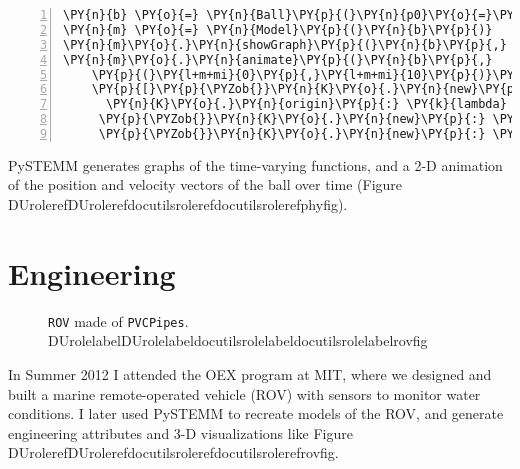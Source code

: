 \documentclass[letterpaper,compsoc,twoside]{IEEEtran}
\makeatletter
\def\PY@reset{\let\PY@it=\relax \let\PY@bf=\relax \let\PY@ul=\relax \let\PY@tc=\relax \let\PY@bc=\relax \let\PY@ff=\relax}
\def\PY@tok#1{\csname PY@tok@#1\endcsname}
\def\PY@toks#1+{\ifx\relax#1\empty\else \PY@tok{#1}\expandafter\PY@toks\fi}
\def\PY@do#1{\PY@bc{\PY@tc{\PY@ul{\PY@it{\PY@bf{\PY@ff{#1}}}}}}}
\def\PY#1#2{\PY@reset\PY@toks#1+\relax+\PY@do{#2}}
\def\PYZus{\char`\_}
\def\PYZob{\char`\{}
\def\PYZcb{\char`\}}
\def\PYZsq{\char`\'}
\providecommand*{\DUrole}[2]{\ifcsname DUrole#1\endcsname \csname DUrole#1\endcsname{#2}\else \ifcsname docutilsrole#1\endcsname \csname docutilsrole#1\endcsname{#2}\else #2\fi \fi }
\makeatother
\begin{document}
\begin{Verbatim}[commandchars=\\\{\},numbers=left,firstnumber=1,stepnumber=1,fontsize=\footnotesize,xleftmargin=2.25mm,numbersep=3pt]
\PY{n}{b} \PY{o}{=} \PY{n}{Ball}\PY{p}{(}\PY{n}{p0}\PY{o}{=}\PY{o}{.}\PY{o}{.}\PY{o}{.}\PY{p}{,} \PY{n}{v0}\PY{o}{=}\PY{o}{.}\PY{o}{.}\PY{o}{.}\PY{p}{,} \PY{n}{mass}\PY{o}{=}\PY{o}{.}\PY{o}{.}\PY{o}{.}\PY{p}{,} \PY{n}{forces}\PY{o}{=}\PY{o}{.}\PY{o}{.}\PY{o}{.}\PY{p}{)}
\PY{n}{m} \PY{o}{=} \PY{n}{Model}\PY{p}{(}\PY{n}{b}\PY{p}{)}
\PY{n}{m}\PY{o}{.}\PY{n}{showGraph}\PY{p}{(}\PY{n}{b}\PY{p}{,} \PY{p}{(}\PY{l+s}{\PYZsq{}}\PY{l+s}{a\PYZus{}y}\PY{l+s}{\PYZsq{}}\PY{p}{,}\PY{l+s}{\PYZsq{}}\PY{l+s}{v\PYZus{}y}\PY{l+s}{\PYZsq{}}\PY{p}{,}\PY{l+s}{\PYZsq{}}\PY{l+s}{p\PYZus{}y}\PY{l+s}{\PYZsq{}}\PY{p}{)}\PY{p}{,} \PY{p}{(}\PY{l+m+mi}{0}\PY{p}{,}\PY{l+m+mi}{10}\PY{p}{)}\PY{p}{)}
\PY{n}{m}\PY{o}{.}\PY{n}{animate}\PY{p}{(}\PY{n}{b}\PY{p}{,}
    \PY{p}{(}\PY{l+m+mi}{0}\PY{p}{,}\PY{l+m+mi}{10}\PY{p}{)}\PY{p}{,}
    \PY{p}{[}\PY{p}{\PYZob{}}\PY{n}{K}\PY{o}{.}\PY{n}{new}\PY{p}{:} \PY{n}{K}\PY{o}{.}\PY{n}{shape}\PY{p}{,}
      \PY{n}{K}\PY{o}{.}\PY{n}{origin}\PY{p}{:} \PY{k}{lambda} \PY{n}{b}\PY{p}{,}\PY{n}{t}\PY{p}{:} \PY{p}{[}\PY{n}{b}\PY{o}{.}\PY{n}{p\PYZus{}x}\PY{p}{(}\PY{n}{t}\PY{p}{)}\PY{p}{,} \PY{n}{b}\PY{o}{.}\PY{n}{p\PYZus{}y}\PY{p}{(}\PY{n}{t}\PY{p}{)}\PY{p}{]}\PY{p}{]}\PY{p}{\PYZcb{}}\PY{p}{,}
     \PY{p}{\PYZob{}}\PY{n}{K}\PY{o}{.}\PY{n}{new}\PY{p}{:} \PY{n}{K}\PY{o}{.}\PY{n}{line}\PY{p}{,} \PY{n}{point\PYZus{}list}\PY{o}{=}\PY{k}{lambda} \PY{n}{b}\PY{p}{,}\PY{n}{t}\PY{p}{:} \PY{o}{.}\PY{o}{.}\PY{o}{.}\PY{p}{\PYZcb{}}\PY{p}{,}
     \PY{p}{\PYZob{}}\PY{n}{K}\PY{o}{.}\PY{n}{new}\PY{p}{:} \PY{n}{K}\PY{o}{.}\PY{n}{line}\PY{p}{,} \PY{n}{point\PYZus{}list}\PY{o}{=}\PY{k}{lambda} \PY{n}{b}\PY{p}{,}\PY{n}{t}\PY{p}{:} \PY{o}{.}\PY{o}{.}\PY{o}{.}\PY{p}{\PYZcb{}}\PY{p}{]} \PY{p}{)}
\end{Verbatim}
PySTEMM generates graphs of the time-varying functions, and a 2-D animation of the position and velocity vectors of the ball over time (Figure \DUrole{ref}{phyfig}).

\section{Engineering\label{engineering}}
\begin{figure}[]\noindent{}
\caption{\texttt{ROV} made of \texttt{PVCPipes}. \DUrole{label}{rovfig}}
\end{figure}

In Summer 2012 I attended the OEX program at MIT, where we designed and built a marine remote-operated vehicle (ROV) with sensors to monitor water conditions. I later used PySTEMM to recreate models of the ROV, and generate engineering attributes and 3-D visualizations like Figure \DUrole{ref}{rovfig}.
\end{document}
